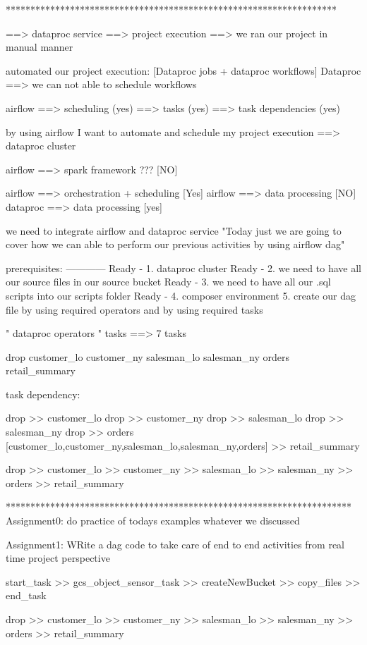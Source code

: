 *******************************************************************

==> dataproc service ==> project execution ==> we ran our project in manual manner 

automated our project execution: [Dataproc jobs + dataproc workflows]
Dataproc ==> we can not able to schedule workflows 

airflow ==> scheduling (yes) 
		==> tasks (yes)
		==> task dependencies (yes)
		
by using airflow I want to automate and schedule my project execution ==> dataproc cluster

airflow ==> spark framework ??? [NO]

airflow ==> orchestration + scheduling [Yes]
airflow ==> data processing [NO]
dataproc ==> data processing [yes]

we need to integrate airflow and dataproc service 
	"Today just we are going to cover how we can able to perform our previous activities by using airflow dag"
	
prerequisites:
------------
Ready - 1. dataproc cluster
Ready - 2. we need to have all our source files in our source bucket 
Ready - 3. we need to have all our .sql scripts into our scripts folder
Ready - 4. composer environment
5. create our dag file by using required operators and by using required tasks 

" dataproc operators "
tasks ==> 7 tasks 

drop
customer_lo
customer_ny
salesman_lo
salesman_ny
orders
retail_summary 

task dependency:

drop >> customer_lo
drop >> customer_ny
drop >> salesman_lo
drop >> salesman_ny
drop >> orders
[customer_lo,customer_ny,salesman_lo,salesman_ny,orders] >> retail_summary

drop >> customer_lo >> customer_ny >> salesman_lo >> salesman_ny >> orders >> retail_summary

**********************************************************************
Assignment0: do practice of todays examples whatever we discussed


Assignment1:
	WRite a dag code to take care of end to end activities from real time project perspective
	
	start_task >> gcs_object_sensor_task >> createNewBucket >> copy_files >> end_task
	
	drop >> customer_lo >> customer_ny >> salesman_lo >> salesman_ny >> orders >> retail_summary
	
